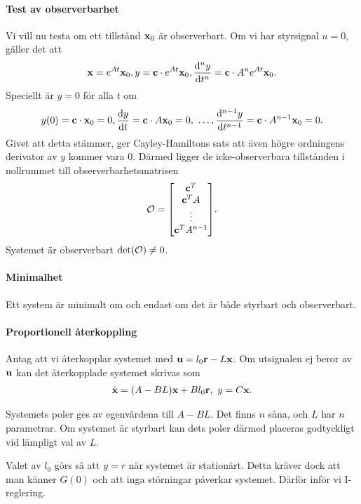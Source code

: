 \paragraph{Test av observerbarhet}
Vi vill nu testa om ett tillstånd $\vb{x}_{0}$ är observerbart. Om vi har styrsignal $u = 0$, gäller det att
\begin{align*}
	\vb{x} = e^{At}\vb{x}_{0}, y = \vb{c}\cdot e^{At}\vb{x}_{0}, \dv[n]{y}{t} = \vb{c}\cdot A^{n}e^{At}\vb{x}_{0}.
\end{align*}
Speciellt är $y = 0$ för alla $t$ om
\begin{align*}
	y(0) = \vb{c}\cdot\vb{x}_{0} = 0, \dv{y}{t} = \vb{c}\cdot A\vb{x}_{0} = 0,\ \dots, \dv[n - 1]{y}{t} = \vb{c}\cdot A^{n - 1}\vb{x}_{0} = 0.
\end{align*}
Givet att detta stämmer, ger Cayley-Hamiltons sats att även högre ordningens derivator av $y$ kommer vara $0$. Därmed ligger de icke-observerbara tillstånden i nollrummet till observerbarhetsmatrisen
\begin{align*}
	\O =
	\mqty[
		\vb{c}^{T} \\
		\vb{c}^{T}A \\
		\vdots \\
		\vb{c}^{T}A^{n - 1}
	].
\end{align*}
Systemet är observerbart $\det(\mathcal{O}) \neq 0$.

\paragraph{Minimalhet}
Ett system är minimalt om och endast om det är både styrbart och observerbart.

\paragraph{Proportionell återkoppling}
Antag att vi återkopplar systemet med $\vb{u} = l_{0}\vb{r} - L\vb{x}$. Om utsignalen ej beror av $\vb{u}$ kan det återkopplade systemet skrivas som
\begin{align*}
	\dot{\vb{x}} = (A - BL)\vb{x} + Bl_{0}\vb{r},\ y = C\vb{x}.
\end{align*}

Systemets poler ges av egenvärdena till $A - BL$. Det finns $n$ såna, och $L$ har $n$ parametrar. Om systemet är styrbart kan dets poler därmed placeras godtyckligt vid lämpligt val av $L$.

Valet av $l_{0}$ görs så att $y = r$ när systemet är stationärt. Detta kräver dock att man känner $G(0)$ och att inga störningar påverkar systemet. Därför inför vi I-reglering.

